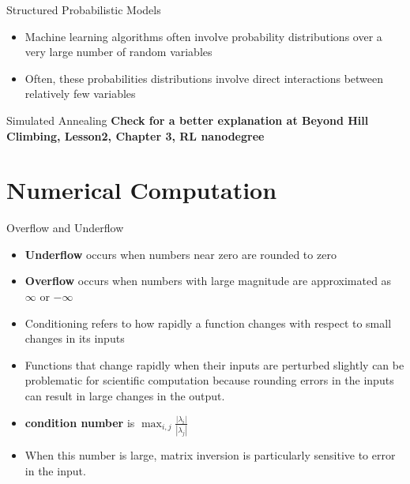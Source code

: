 \documentclass[10pt,mathserif]{beamer}
\begin{document}
\begin{frame}{Structured Probabilistic Models}
\begin{itemize}
\item Machine learning algorithms often involve probability distributions over a very large number of 
random variables
\item Often, these probabilities distributions involve direct interactions between relatively few variables
\end{itemize}
\end{frame}

\begin{frame}{Simulated Annealing}
\textbf{Check for a better explanation at Beyond Hill Climbing, Lesson2, Chapter 3, RL nanodegree}
\end{frame}


\section{Numerical Computation}
\begin{frame}{Overflow and Underflow}
\begin{itemize}
\item \textbf{Underflow} occurs when numbers near zero are rounded to zero
\item \textbf{Overflow} occurs when numbers with large magnitude are approximated as $\infty$ or $-\infty$
\item Conditioning refers to how rapidly a function changes with respect to small changes in its inputs
\item Functions that change rapidly when their inputs are perturbed slightly can be problematic for scientific
computation because rounding errors in the inputs can result in large changes in the output.
\item \textbf{condition number} is $\max_{i,j}\frac{|\lambda_i|}{|\lambda_j|}$
\item When this number is large, matrix inversion is particularly sensitive to error in the input.
\end{itemize}
\end{frame}
\end{document}
